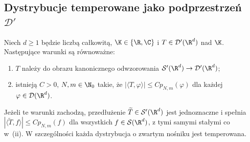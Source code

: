 \subsection{Dystrybucje temperowane jako podprzestrzeń \texorpdfstring{$\mathcal D'$}{D'}}

\begin{twierdzenie}
\label{thm:temp-criterion25}
Niech $d\ge1$ będzie liczbą całkowitą, $\K\in\{\R,\C\}$
i $T\in\mathcal D'(\R^d)$ nad $\K$.
Następujące warunki są równoważne:
\begin{enumerate}[label=\textup{(\roman*)}]
\item $T$ należy do obrazu kanonicznego odwzorowania
$\mathcal S'(\R^d)\to\mathcal D'(\R^d)$;
\item istnieją $C>0$, $N,m\in\N_0$ takie, że
$|\langle T,\varphi\rangle|\le C p_{N,m}(\varphi)$
dla każdej $\varphi\in\mathcal D(\R^d)$.
\end{enumerate}
Jeżeli te warunki zachodzą, przedłużenie
$\widetilde T\in\mathcal S'(\R^d)$ jest jednoznaczne
i spełnia $|\langle\widetilde T,f\rangle|\le C p_{N,m}(f)$
dla wszystkich $f\in\mathcal S(\R^d)$, z tymi samymi
stałymi co w~\textup{(ii)}. W szczególności każda
dystrybucja o zwartym nośniku jest temperowana.
\end{twierdzenie}
